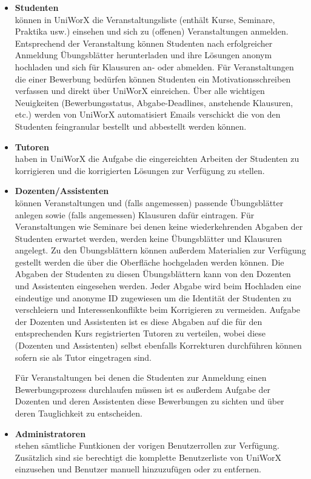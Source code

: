 \documentclass[11pt,a4paper,twoside,ngerman]{article}
\begin{document}
\begin{itemize}
    \item \textbf{Studenten} \hfill \\ 
    können in UniWorX die Veranstaltungsliste (enthält Kurse, Seminare, Praktika usw.) einsehen und sich zu (offenen) Veranstaltungen anmelden. Entsprechend der Veranstaltung können Studenten nach erfolgreicher Anmeldung Übungsblätter herunterladen und ihre Lösungen anonym hochladen und sich für Klausuren an- oder abmelden. Für Veranstaltungen die einer Bewerbung bedürfen können Studenten ein Motivationsschreiben verfassen und direkt über UniWorX einreichen. Über alle wichtigen Neuigkeiten (Bewerbungsstatus, Abgabe-Deadlines, anstehende Klausuren, etc.) werden von UniWorX automatisiert Emails verschickt die von den Studenten feingranular bestellt und abbestellt werden können.
    \item \textbf{Tutoren} \hfill \\ 
    haben in UniWorX die Aufgabe die eingereichten Arbeiten der Studenten zu korrigieren und die korrigierten Lösungen zur Verfügung zu stellen.
    \item \textbf{Dozenten/Assistenten} \hfill \\
    können Veranstaltungen und (falls angemessen) passende Übungsblätter anlegen sowie (falls angemessen) Klausuren dafür eintragen. Für Veranstaltungen wie Seminare bei denen keine wiederkehrenden Abgaben der Studenten erwartet werden, werden keine Übungsblätter und Klausuren angelegt. Zu den Übungsblättern können außerdem Materialien zur Verfügung gestellt werden die über die Oberfläche hochgeladen werden können.
    Die Abgaben der Studenten zu diesen Übungsblättern kann von den Dozenten und Assistenten eingesehen werden. Jeder Abgabe wird beim Hochladen eine eindeutige und anonyme ID zugewiesen um die Identität der Studenten zu verschleiern und Interessenkonflikte beim Korrigieren zu vermeiden. Aufgabe der Dozenten und Assistenten ist es diese Abgaben auf die für den entsprechenden Kurs registrierten Tutoren zu verteilen, wobei diese (Dozenten und Assistenten) selbst ebenfalls Korrekturen durchführen können sofern sie als Tutor eingetragen sind.

    Für Veranstaltungen bei denen die Studenten zur Anmeldung einen Bewerbungsprozess durchlaufen müssen ist es außerdem Aufgabe der Dozenten und deren Assistenten diese Bewerbungen zu sichten und über deren Tauglichkeit zu entscheiden.
    \item \textbf{Administratoren} \hfill \\
    stehen sämtliche Funtkionen der vorigen Benutzerrollen zur Verfügung. Zusätzlich sind sie berechtigt die komplette Benutzerliste von UniWorX einzusehen und Benutzer manuell hinzuzufügen oder zu entfernen.
\end{itemize}
\end{document}
